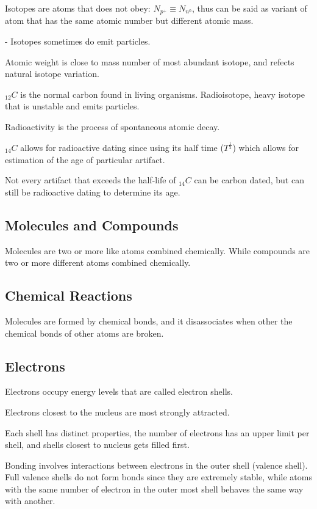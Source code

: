 \documentclass[12pt, UTF8]{article}
\begin{document}
	Isotopes are atoms that does not obey: $N_{p^{+}} \equiv N_{n^{0}}$, thus can be said as variant of atom that has the same atomic number but different atomic mass.
	
	- Isotopes sometimes do emit particles.
	
	Atomic weight is close to mass number of most abundant isotope, and refects natural isotope variation.
	
	$_{12}C$ is the normal carbon found in living organisms. Radioisotope, heavy isotope that is unstable and emits particles.
	
	Radioactivity is the process of spontaneous atomic decay.
	
	$_{14}C$ allows for radioactive dating since using its half time ($T^{\frac{1}{2}}$) which allows for estimation of the age of particular artifact.
	
	Not every artifact that exceeds the half-life of $_{14}C$ can be carbon dated, but can still be radioactive dating to determine its age.
	
	\subsection*{Molecules and Compounds}
	
	Molecules are two or more like atoms combined chemically. While compounds are two or more different atoms combined chemically.
	
	\subsection*{Chemical Reactions}
	
	Molecules are formed by chemical bonds, and it disassociates when other the chemical bonds of other atoms are broken.
	
	\subsection*{Electrons}
	
	Electrons occupy energy levels that are called electron shells.
	
	Electrons closest to the nucleus are most strongly attracted.
	
	Each shell has distinct properties, the number of electrons has an upper limit per shell, and shells closest to nucleus gets filled first.
	
	Bonding involves interactions between electrons in the outer shell (valence shell). Full valence shells do not form bonds since they are extremely stable, while atoms with the same number of electron in the outer most shell behaves the same way with another.
	
\end{document}
